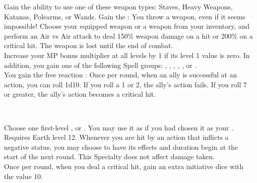\begin{tabjob}
    \tabjobspec{}

         Gain the ability to use one of these weapon types: Staves, Heavy Weapons, Katanas, Polearms, or Wands. Gain the  : You throw a weapon, even if it seems impossible! Choose your equipped weapon or a weapon from your inventory, and perform an Air vs Air attack to deal 150\% weapon damage on a hit or 200\% on a critical hit. The weapon is lost until the end of combat. \\

         Increase your MP bonus multiplier at all levels by 1 if its level 1 value is zero. In addition, you gain one of the following Spell groups: , , , , , or . \\
        
         You gain the free reaction : Once per round, when an ally is successful at an action, you can roll 1d10. If you roll a 1 or 2, the ally's action fails. If you roll 7 or greater, the ally's action becomes a critical hit. \\

    \tabjobsep%

     \\
    \tabjobspec{}

         Choose one first-level ,  or . You may use it as if you had chosen it as your . \\

         Requires Earth level 12. Whenever you are hit by an action that inflicts a negative status, you may choose to have its effects and duration begin at the start of the next round. This Specialty does not affect damage taken. \\

         Once per round, when you deal a critical hit, gain an extra initiative dice with the value 10. \\

    \tabjobsep%

     \\
    \tabjobspec{}
    

\end{tabjob}
